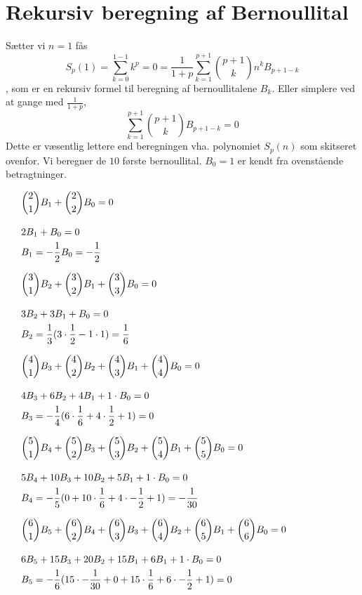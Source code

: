\section{Rekursiv beregning af Bernoullital}
Sætter vi  \(n=1\) fås
\[S_{p}(1)=\sum_{k=0}^{1-1}k^{p}=0=\frac{1}{1+p}\sum_{k=1}^{p+1}\binom{p+1}{k}n^{k}B_{p+1-k}\]
, som er en rekursiv formel til beregning af bernoullitalene \(B_{k}\).
Eller simplere ved at gange med  \(\frac{1}{1+p}\),
\[\sum_{k=1}^{p+1}\binom{p+1}{k}B_{p+1-k}=0\]	 
Dette er væsentlig lettere end beregningen vha. polynomiet \(S_{p}(n)\) som skitseret ovenfor.
Vi beregner de \(10\) første bernoullital.
\(B_{0} = 1\) er kendt fra ovenstående betragtninger.\\
\begin{align*}
&\MinLinie
&\binom{2}{1}B_{1}+\binom{2}{2}B_{0}=0\nylinie
&2B_{1}+B_{0}=0\\
&B_{1}=-\frac{1}{2}B_{0}=-\frac{1}{2}\\
\end{align*}
\begin{align*}
&\MinLinie
&\binom{3}{1}B_{2}+\binom{3}{2}B_{1}+\binom{3}{3}B_{0}=0\nylinie
&3B_{2}+3B_{1}+B_{0}=0\\
&B_{2}=\frac{1}{3}(3 \cdot \frac{1}{2}-1 \cdot 1)=\frac{1}{6}\\
\end{align*}
\begin{align*}
&\MinLinie
&\binom{4}{1}B_{3}+\binom{4}{2}B_{2}+\binom{4}{3}B_{1}+\binom{4}{4}B_{0}=0\nylinie
&4B_{3}+6B_{2}+4B_{1}+1 \cdot B_{0}=0\\
&B_{3}=-\frac{1}{4}(6 \cdot \frac{1}{6}+4 \cdot \frac{1}{2}+1)=0\\
\end{align*}
\begin{align*}
&\MinLinie
&\binom{5}{1}B_{4}+\binom{5}{2}B_{3}+\binom{5}{3}B_{2}+\binom{5}{4}B_{1}+\binom{5}{5}B_{0}=0\nylinie
&5B_{4}+10B_{3}+10B_{2}+5B_{1}+1 \cdot B_{0}=0\\
&B_{4}=-\frac{1}{5}(0+10 \cdot \frac{1}{6}+4 \cdot -\frac{1}{2}+1)=-\frac{1}{30}\\
\end{align*}
\begin{align*}
&\MinLinie
&\binom{6}{1}B_{5}+\binom{6}{2}B_{4}+\binom{6}{3}B_{3}+\binom{6}{4}B_{2}+\binom{6}{5}B_{1}+\binom{6}{6}B_{0}=0\nylinie
&6B_{5}+15B_{3}+20B_{2}+15B_{1}+6B_{1}+1 \cdot B_{0}=0\\
&B_{5}=-\frac{1}{6}(15 \cdot -\frac{1}{30}+0+15 \cdot \frac{1}{6}+6 \cdot -\frac{1}{2}+1)=0\\
\end{align*}
